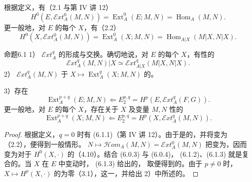 根据定义，有（2.1 与第 IV 讲 12）
\begin{equation}H^0(E,\mathscr Ext_A^0(M,N))=\operatorname{Ext}_A^0(E;M,N)=\operatorname{Hom}_A(M,N).\tag{6.0.3}\end{equation}
更一般地，对 $E$ 的每个 $X$，有（2.2）
\begin{equation}H^0(X,\mathscr Ext_A^0(M,N))=\operatorname{Ext}_A^0(X;M,N)=\operatorname{Hom}_{A|X}(M|X,N|X).\tag{6.0.4}\end{equation}
\begin{SGAresult}{命题}{6.1}
1） $\mathscr Ext_A^q$ 的形成与交换。确切地说，对 $E$ 的每个 $X$，有性的
\begin{equation}\mathscr Ext_A^q(M,N)|X\simeq\mathscr Ext_{A|X}^q(M|X,N|X).\tag{6.1.1}\end{equation}
2） $\mathscr Ext_A^q(M,N)$ 于 $X\mapsto\operatorname{Ext}_A^q(X;M,N)$ 的。

3）存在
\begin{equation}\operatorname{Ext}_A^{p+q}(E;M,N)\Longleftarrow E_2^{p,q}=H^p(E,\mathscr Ext_A^q(F,G)).\tag{6.1.2}\end{equation}
更一般地，对 $E$ 的每个 $X$，存在关于 $X$ 及变量 $M,N$ 性的
\begin{equation}\operatorname{Ext}_A^{p+q}(X;M,N)\Longleftarrow E_2^{p,q}=H^p(X,\mathscr Ext_A^q(M,N)).\tag{6.1.3}\end{equation}
\end{SGAresult}
\begin{proof}
根据定义，$q=0$ 时有 (6.1.1)（第 IV 讲 12）。由于是的，并将变为（2.2），便得到一般情形。 $N\mapsto\mathscr Hom_A(M,N)=\mathscr Ext_A^0(M,N)$ 把变为，因而变为对于 $H^0(X,\cdot)$ 的（4.10）。结合 (6.0.3) 与 (6.0.4)， (6.1.2)、(6.1.3) 就是复合的。当 $X$ 在 $E$ 中变动时， (6.1.3) 给出的，
取便得到的。由于 $p\ne0$ 时， $X\mapsto H^p(X,\cdot)$ 的为零（3.1），这一，并给出 2）中所述的。
\end{proof}
